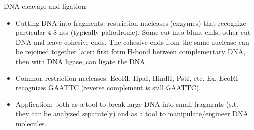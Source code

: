 \documentclass{report}
\begin{document}
DNA cleavage and ligation: 
\begin{itemize}
	\item Cutting DNA into fragments: restriction nucleases (enzymes) that recognize particular 4-8 nts (typically paliodrome). Some cut into blunt ends, other cut DNA and leave cohesive ends. The cohesive ends from the same nuclease can be rejoined together later: first form H-bond between complementary DNA, then with DNA ligase, can ligate the DNA. 

	\item Common restriction nucleases: EcoRI, HpaI, HindII, PstI, etc. Ex. EcoRI recognizes GAATTC (reverse complement is still GAATTC). 
	
	\item Application: both as a tool to break large DNA into small fragments (s.t. they can be analyzed separately) and as a tool to manipulate/engineer DNA molecules. 
\end{itemize}
\end{document}
